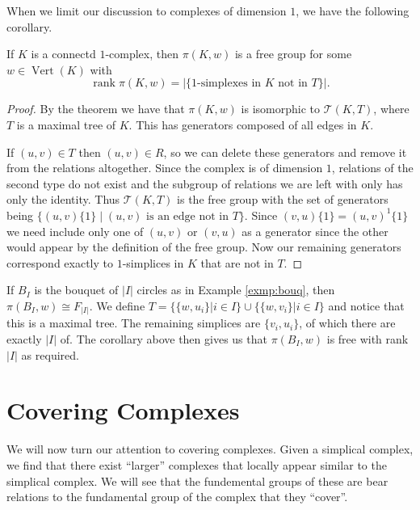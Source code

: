 When we limit our discussion to complexes of dimension $1$, we have the following corollary.

\begin{corollary}
  \label{cor:1free}
  If $K$ is a connectd $1$-complex, then $\pi(K,w)$ is a free group for some $w \in \operatorname{Vert}(K)$ with
  \begin{equation*}
    \operatorname{rank} \pi(K,w) = |\{1 \text{-simplexes in } K \text{ not in } T \}|.
  \end{equation*}
\end{corollary}

\begin{proof}
  By the theorem we have that $\pi(K,w)$ is isomorphic to $\mathcal{T}(K,T)$, where $T$ is a maximal tree of $K$. This has generators composed of all edges in $K$.

  If $(u,v) \in T$ then $(u,v) \in R$, so we can delete these generators and remove it from the relations altogether. Since the complex is of dimension $1$, relations of the second type do not exist and the subgroup of relations we are left with only has only the identity. Thus $\mathcal{T}(K,T)$ is the free group with the set of generators being $\{(u,v) \{1\} \mid (u,v) \text{ is an edge not in } T\}$. Since $(v,u) \{1\} = (u,v)^{1} \{ 1 \}$ we need include only one of $(u,v)$ or $(v,u)$ as a generator since the other would appear by the definition of the free group. Now our remaining generators correspond exactly to $1$-simplices in $K$ that are not in $T$.
\end{proof}


\begin{example}
  \label{exmp:bouq-fund}
  If $B_I$ is the bouquet of $|I|$ circles as in Example \ref{exmp:bouq}, then $\pi(B_I,w) \cong F_{|I|}$. We define $T = \{ \{w,u_i \} | i \in I \} \cup \{ \{w,v_i \} | i \in I \}$ and notice that this is a maximal tree. The remaining simplices are $\{v_i,u_i\}$, of which there are exactly $|I|$ of. The corollary above then gives us that $\pi(B_I,w)$ is free with rank $|I|$ as required.
\end{example}

\section{Covering Complexes}
We will now turn our attention to covering complexes. Given a simplical complex, we find that there exist ``larger'' complexes that locally appear similar to the simplical complex. We will see that the fundemental groups of these are bear relations to the fundamental group of the complex that they ``cover''.

